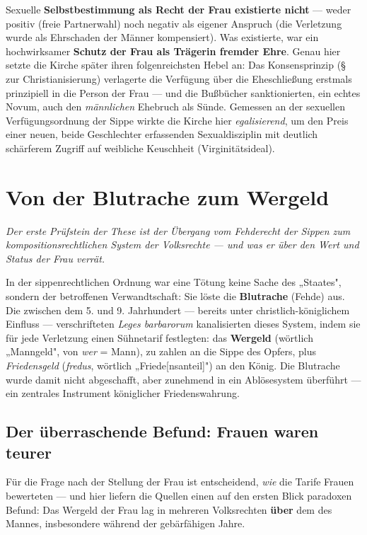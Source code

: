 \documentclass[11pt,a4paper,ngerman]{scrartcl}
\newcommand{\chipbase}[2]{\hspace{0pt}{\footnotesize\textcolor{#1}{[\textsc{#2}]}}}
\newcommand{\chipbelegt}[1]{\chipbase{chipgreen}{#1}}
\newcommand{\chipplausibel}[1]{\chipbase{chipamber}{#1}}
\newenvironment{callout}[2]{%
  \def\FrameCommand{{\color{#1}\vrule width 2pt}\hspace{8pt}}%
  \MakeFramed{\advance\hsize-\width\FrameRestore}%
  \noindent{\small\scshape\color{#1}#2}\par\smallskip\small
}{\endMakeFramed\medskip}
\begin{document}
\begin{callout}{gold}{Befund}
Sexuelle \textbf{Selbstbestimmung als Recht der Frau existierte nicht} — weder positiv (freie Partnerwahl) noch negativ als eigener Anspruch (die Verletzung wurde als Ehrschaden der Männer kompensiert). Was existierte, war ein hochwirksamer \textbf{Schutz der Frau als Trägerin fremder Ehre}. Genau hier setzte die Kirche später ihren folgenreichsten Hebel an: Das Konsensprinzip (§ zur Christianisierung) verlagerte die Verfügung über die Eheschließung erstmals prinzipiell in die Person der Frau — und die Bußbücher sanktionierten, ein echtes Novum, auch den \emph{männlichen} Ehebruch als Sünde. Gemessen an der sexuellen Verfügungsordnung der Sippe wirkte die Kirche hier \emph{egalisierend}, um den Preis einer neuen, beide Geschlechter erfassenden Sexualdisziplin mit deutlich schärferem Zugriff auf weibliche Keuschheit (Virginitätsideal). \chipplausibel{plausibel}
\end{callout}


\section{Von der Blutrache zum Wergeld}

\noindent\textit{Der erste Prüfstein der These ist der Übergang vom Fehderecht der Sippen zum kompositionsrechtlichen System der Volksrechte — und was er über den Wert und Status der Frau verrät.}
\medskip

In der sippenrechtlichen Ordnung war eine Tötung keine Sache des „Staates", sondern der betroffenen Verwandtschaft: Sie löste die \textbf{Blutrache} (Fehde) aus. Die zwischen dem 5. und 9. Jahrhundert — bereits unter christlich-königlichem Einfluss — verschrifteten \emph{Leges barbarorum} kanalisierten dieses System, indem sie für jede Verletzung einen Sühnetarif festlegten: das \textbf{Wergeld} (wörtlich „Manngeld", von \emph{wer} = Mann), zu zahlen an die Sippe des Opfers, plus \emph{Friedensgeld} (\emph{fredus}, wörtlich „Friede[nsanteil]") an den König. Die Blutrache wurde damit nicht abgeschafft, aber zunehmend in ein Ablösesystem überführt — ein zentrales Instrument königlicher Friedenswahrung. \chipbelegt{belegt}

\subsection*{Der überraschende Befund: Frauen waren teurer}

Für die Frage nach der Stellung der Frau ist entscheidend, \emph{wie} die Tarife Frauen bewerteten — und hier liefern die Quellen einen auf den ersten Blick paradoxen Befund: Das Wergeld der Frau lag in mehreren Volksrechten \textbf{über} dem des Mannes, insbesondere während der gebärfähigen Jahre.
\end{document}
